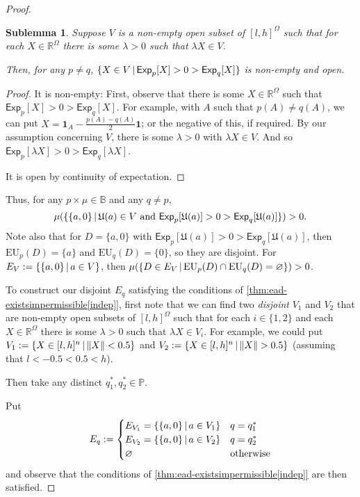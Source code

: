 \documentclass[a4paper]{article}
\newtheorem{sublemma}{Sublemma}[theorem]
\renewcommand\P{\mathbb{P}} %
\newcommand\Exp{\mathsf{Exp}}
\newcommand\EU{\mathrm{EU}}
\newcommand\U{\mathfrak{U}} %
\newcommand{\IB}{\mathbb{B}}
\newcommand{\IP}{\P}
\renewcommand{\Re}{\mathbb{R}}
\newcommand\SetDelimiter[1][]{
	\nonscript\,#1\vert \allowbreak \nonscript\,\mathopen{}}
\providecommand\given{\SetDelimiter}
\renewcommand{\emptyset}{\varnothing}
\newenvironment{CCM rewritten}
{\begingroup\color{blue}} %
{\endgroup}              %
\begin{document}
\begin{proof}





\begin{sublemma}
	Suppose $V$ is a non-empty open subset of $[l,h]^\Omega$ such that for each $X\in \Re^\Omega$ there is some $\lambda>0$ such that $\lambda X\in V$. 
	
	Then, for any $p\neq q$, $\{X\in V\given \Exp_p[X]>0>\Exp_q[X]\}$ is non-empty and open.
\end{sublemma}
\begin{proof}
	{It is non-empty}:
	First, observe that there is some $X\in\Re^\Omega$ such that $\Exp_p[X]>0>\Exp_q[X]$. For example, with $A$ such that $p(A)\neq q(A)$, we can put $X=\mathbf{1}_A-\frac{p(A)-q(A)}{2}\mathbf{1}$; or the negative of this, if required. %
	By our assumption concerning $V$, there is some $\lambda >0$ with $\lambda X\in V$. And so $\Exp_p[\lambda X]>0>\Exp_{q}[\lambda X]$. 
	
	It is open by continuity of expectation. 
\end{proof}

Thus, for any $p\times\mu\in\IB$ and any $q\neq p$, $$\mu(\{\{a,0\}\given \U(a)\in V\text{ and }\Exp_p[\U(a)]>0>\Exp_q[\U(a)] \})>0.$$ Note also that for $D=\{a,0\}$ with $\Exp_p[\U(a)]>0>\Exp_q[\U(a)]$, then $\EU_{p}(D)=\{a\}$ and $\EU_q(D)=\{0\}$, so they are disjoint. 
For $E_V:=\{\{a,0\}\given a\in V\}$, then $\mu(\{D\in E_V\given \EU_p(D)\cap\EU_q(D)=\emptyset\})>0$. 

To construct our disjoint $E_q$ satisfying the conditions of \cref{thm:ead-existsimpermissible[indep]}, first note that we can find two \emph{disjoint} $V_1$ and $V_2$ that are  non-empty open subsets of $[l,h]^\Omega$ such that for each $i\in\{1,2\}$ and each $X\in \Re^\Omega$ there is some $\lambda>0$ such that $\lambda X\in V_i$.
For example, we could put  $V_1:=\{X\in[l,h]^n\given \|X\|<0.5\}$ and $V_2:=\{X\in[l,h]^n\given \|X\|>0.5\}$ (assuming that $l<-0.5<0.5<h$). 


Then take any distinct $q^*_1,q^*_2\in\IP$. 

Put $$E_q:=\begin{cases}
	E_{V_1}=\{\{a,0\}\given a\in V_1\}&q=q^*_1\\
	E_{V_2}=\{\{a,0\}\given a\in V_2\}&q=q^*_2\\
	\emptyset&\text{otherwise}
\end{cases}$$
and observe that the conditions of \cref{thm:ead-existsimpermissible[indep]} are then satisfied. 
\end{proof}
\end{document}

